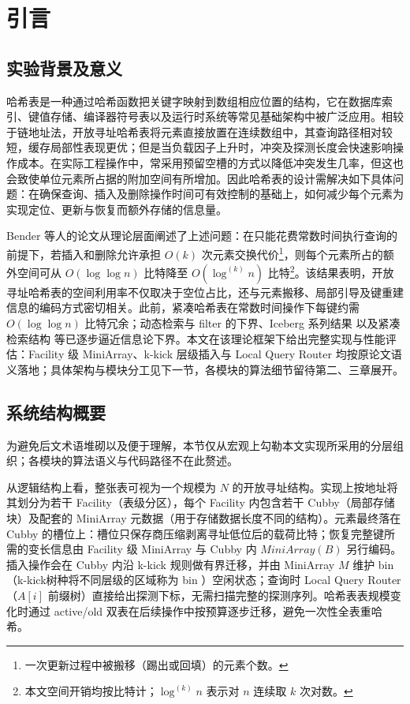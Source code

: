 \chapter{引言}

\section{实验背景及意义}

哈希表是一种通过哈希函数把关键字映射到数组相应位置的结构\cite{knuth1973sorting,bender2024sosa}，它在数据库索引、键值存储、编译器符号表以及运行时系统等常见基础架构中被广泛应用。相较于链地址法，开放寻址哈希表将元素直接放置在连续数组中，其查询路径相对较短，缓存局部性表现更优；但是当负载因子上升时，冲突及探测长度会快速影响操作成本。在实际工程操作中，常采用预留空槽的方式以降低冲突发生几率，但这也会致使单位元素所占据的附加空间有所增加。因此哈希表的设计需解决如下具体问题：在确保查询、插入及删除操作时间可有效控制的基础上，如何减少每个元素为实现定位、更新与恢复而额外存储的信息量。

Bender 等人的论文\cite{bender2022otsh}从理论层面阐述了上述问题：在只能花费常数时间执行查询的前提下，若插入和删除允许承担 \(O(k)\) 次元素交换代价\footnote{一次更新过程中被搬移（踢出或回填）的元素个数。}，则每个元素所占的额外空间可从 \(O(\log\log n)\) 比特降至 \(O(\log^{(k)}n)\) 比特\footnote{本文空间开销均按比特计；\(\log^{(k)}n\) 表示对 \(n\) 连续取 \(k\) 次对数。}。该结果表明，开放寻址哈希表的空间利用率不仅取决于空位占比，还与元素搬移、局部引导及键重建信息的编码方式密切相关。此前，紧凑哈希表在常数时间操作下每键约需 \(O(\log\log n)\) 比特冗余；动态检索与 filter 的下界\cite{kuszmaul2024filters}、Iceberg 系列结果\cite{bender2024iceberg,pandey2023iceberght} 以及紧凑检索结构\cite{pagh2008retrieval} 等已逐步逼近信息论下界。本文在该理论框架下给出完整实现与性能评估：Facility 级 MiniArray、k-kick 层级插入与 Local Query Router 均按原论文语义落地；具体架构与模块分工见下一节，各模块的算法细节留待第二、三章展开。

\section{系统结构概要}

为避免后文术语堆砌以及便于理解，本节仅从宏观上勾勒本文实现所采用的分层组织；各模块的算法语义与代码路径不在此赘述。

从逻辑结构上看，整张表可视为一个规模为 \(N\) 的开放寻址结构。实现上按地址将其划分为若干 Facility（表级分区），每个 Facility 内包含若干 Cubby（局部存储块）及配套的 MiniArray 元数据（用于存储数据长度不同的结构）。元素最终落在 Cubby 的槽位上：槽位只保存商压缩剥离寻址低位后的载荷比特；恢复完整键所需的变长信息由 Facility 级 MiniArray 与 Cubby 内 \( MiniArray (B)\) 另行编码。插入操作会在 Cubby 内沿 k-kick 规则做有界迁移，并由 MiniArray \(M\) 维护 bin （k-kick树种将不同层级的区域称为 bin ）空闲状态；查询时 Local Query Router（\(A[i]\) 前缀树）直接给出探测下标，无需扫描完整的探测序列。哈希表表规模变化时通过 active/old 双表在后续操作中按预算逐步迁移，避免一次性全表重哈希。


